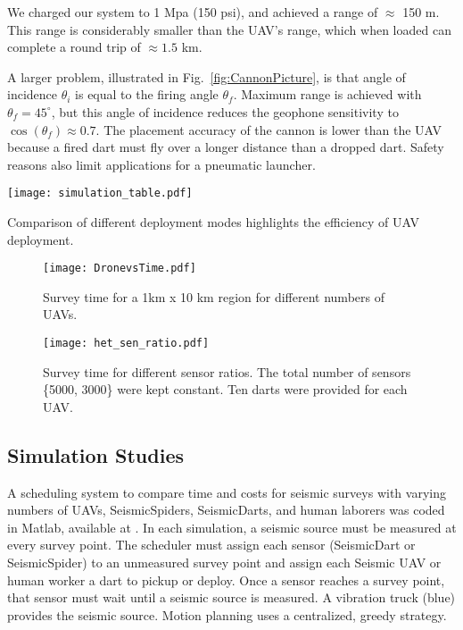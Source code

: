 We charged our system to 1 Mpa (150 psi), and achieved a range of $\approx$ 150 m.
This range is considerably smaller than the UAV's range, which when loaded can complete a round trip of $\approx 1.5$ km.

A larger problem, illustrated in Fig.~\ref{fig:CannonPicture}, is that angle of incidence $\theta_i$ is equal to the firing angle $\theta_f$. 
Maximum range is achieved with $\theta_f = 45^\circ$, but this angle of incidence reduces the geophone sensitivity to $\cos(\theta_f )\approx 0.7$.
The placement accuracy of the cannon is lower than the UAV because a fired dart must fly over a longer distance than a dropped dart. 
Safety reasons also limit applications for a pneumatic launcher.





\begin{table} \centering
  {\texttt{[image: simulation\_table.pdf]}}
 \caption{Comparison of different  deployment modes highlights the efficiency of UAV deployment.} 
 \label{tab:Sim_table}
\end{table}

\begin{figure} \centering
  {\texttt{[image: DronevsTime.pdf]}}
 \caption{Survey time for a 1km x 10 km region for different numbers of UAVs.} 
 \label{fig:DronevsTime}
\end{figure}

\begin{figure} \centering
  {\texttt{[image: het\_sen\_ratio.pdf]}}
 \caption{Survey time for different sensor ratios. The total number of sensors \{5000, 3000\} were kept constant. Ten darts were provided for each UAV. } 
 \label{fig:het_sen_ratio}
\end{figure}

\subsection{Simulation Studies}
A scheduling system to compare  time and costs for seismic surveys with varying numbers of UAVs, SeismicSpiders, SeismicDarts, and human laborers was coded in  {\sc Matlab}, available at \cite{Srikanth2016seismicScheduler}.
   In each simulation, a seismic source must be measured at every survey point. 
   The scheduler must assign each sensor (SeismicDart or SeismicSpider) to an unmeasured survey point and assign each Seismic UAV or human worker a dart to pickup or deploy.  Once a sensor reaches a survey point, that sensor must wait until a seismic source is measured.
      A vibration truck (blue) provides the seismic source.
   Motion planning uses a centralized, greedy strategy.
   
